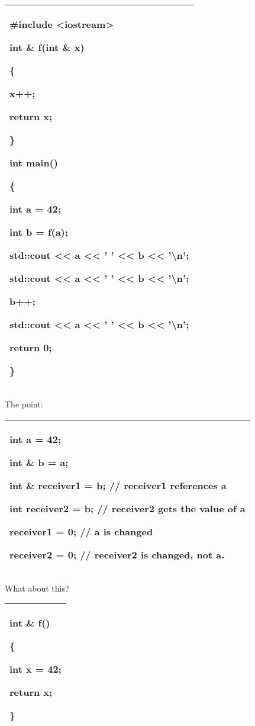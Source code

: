 \documentclass[
]{article}
\begin{document}
\begin{longtable}[]{@{}l@{}}
\toprule
\endhead
\begin{minipage}[t]{0.97\columnwidth}\raggedright
\#include \textless iostream\textgreater{}

int \& f(int \& x)

\{

x++;

return x;

\}

int main()

\{

int a = 42;

int b = f(a);

std::cout \textless\textless{} a \textless\textless{} ' '
\textless\textless{} b \textless\textless{} '\textbackslash n';

std::cout \textless\textless{} a \textless\textless{} ' '
\textless\textless{} b \textless\textless{} '\textbackslash n';

b++;

std::cout \textless\textless{} a \textless\textless{} ' '
\textless\textless{} b \textless\textless{} '\textbackslash n';

return 0;

\}\strut
\end{minipage}\tabularnewline
\bottomrule
\end{longtable}

The point:

\begin{longtable}[]{@{}l@{}}
\toprule
\endhead
\begin{minipage}[t]{0.97\columnwidth}\raggedright
int a = 42;

int \& b = a;

int \& receiver1 = b; // receiver1 references a

int receiver2 = b; // receiver2 gets the value of a

receiver1 = 0; // a is changed

receiver2 = 0; // receiver2 is changed, not a.\strut
\end{minipage}\tabularnewline
\bottomrule
\end{longtable}

What about this?

\begin{longtable}[]{@{}l@{}}
\toprule
\endhead
\begin{minipage}[t]{0.97\columnwidth}\raggedright
int \& f()

\{

int x = 42;

return x;

\}\strut
\end{minipage}\tabularnewline
\bottomrule
\end{longtable}
\end{document}
